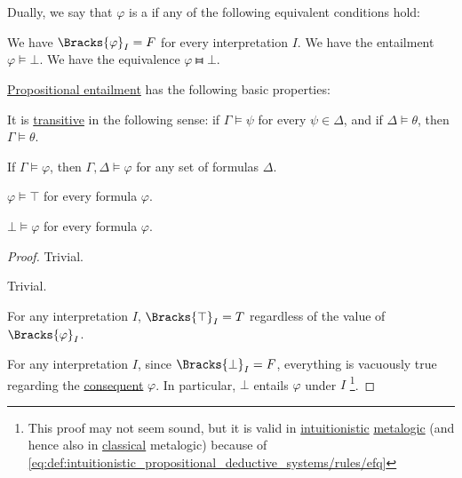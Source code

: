 \begin{definition}
\begin{thmenum}
     Dually, we say that \( \varphi \) is a  if any of the following equivalent conditions hold:
    \begin{thmenum}
       We have \( \Bracks{\varphi}_I = F \) for every interpretation \( I \).
       We have the entailment \( \varphi \vDash \bot \).
       We have the equivalence \( \varphi \gleichstark \bot \).
    \end{thmenum}
  \end{thmenum}
\end{definition}

\begin{proposition}\label{thm:def:propositional_entailment}
  \hyperref[def:propositional_semantics/entailment]{Propositional entailment} has the following basic properties:
  \begin{thmenum}
     It is \hyperref[def:binary_relation/transitive]{transitive} in the following sense: if \( \Gamma \vDash \psi \) for every \( \psi \in \Delta \), and if \( \Delta \vDash \theta \), then \( \Gamma \vDash \theta \).

     If \( \Gamma \vDash \varphi \), then \( \Gamma, \Delta \vDash \varphi \) for any set of formulas \( \Delta \).

     \( \varphi \vDash \top \) for every formula \( \varphi \).

     \( \bot \vDash \varphi \) for every formula \( \varphi \).
  \end{thmenum}
\end{proposition}
\begin{proof}
   Trivial.

   Trivial.

   For any interpretation \( I \), \( \Bracks{\top}_I = T \) regardless of the value of \( \Bracks{\varphi}_I \).

   For any interpretation \( I \), since \( \Bracks{\bot}_I = F \), everything is vacuously true regarding the \hyperref[def:material_implication/consequent]{consequent} \( \varphi \). In particular, \( \bot \) entails \( \varphi \) under \( I \) \footnote{This proof may not seem sound, but it is valid in \hyperref[rem:intuitionistic_logic]{intuitionistic} \hyperref[rem:metalogic]{metalogic} (and hence also in \hyperref[rem:classical_logic]{classical} metalogic) because of \eqref{eq:def:intuitionistic_propositional_deductive_systems/rules/efq}}.
\end{proof}

